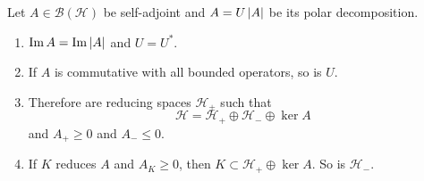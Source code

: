 \documentclass[a4paper,12pt]{article}
\begin{document}
\begin{thm}
    Let $A \in \mathcal{B}(\mathcal{H})$ be self-adjoint and $A = U \left\lvert A\right\lvert$ be its polar decomposition.
    \begin{enumerate}[label=(\arabic{*})]
        \item $\operatorname{Im} A = \operatorname{Im} \left\lvert A\right\lvert$ and $U = U^*$.
        \item If $A$ is commutative with all bounded operators, so is $U$.
        \item Therefore are reducing spaces $\mathcal{H}_{\pm}$ such that
        \begin{equation*}
            \mathcal{H} = \mathcal{H}_+ \oplus \mathcal{H}_- \oplus \ker A
        \end{equation*}
        and $A_+ \geq 0$ and $A_- \leq 0$.
        \item If $K$ reduces $A$ and $A_K \geq 0$, then $K \subset \mathcal{H}_+ \oplus \ker A$. So is $\mathcal{H}_-$.
    \end{enumerate}
\end{thm}
\end{document}
